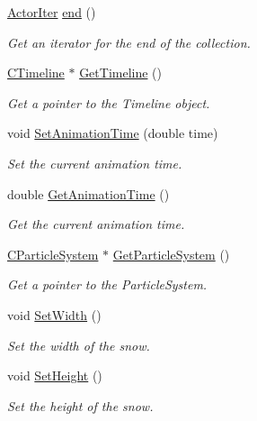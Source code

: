 \begin{DoxyCompactItemize}
\hyperlink{class_c_picture_1_1_actor_iter}{Actor\+Iter} \hyperlink{class_c_picture_a63840c7eff74388a204c750908a23933}{end} ()
\begin{DoxyCompactList}\small\item\em Get an iterator for the end of the collection. \end{DoxyCompactList}\item 
\hyperlink{class_c_timeline}{C\+Timeline} $\ast$ \hyperlink{class_c_picture_a8ba1c7692b6a0ad3cf4984faf84a117a}{Get\+Timeline} ()
\begin{DoxyCompactList}\small\item\em Get a pointer to the Timeline object. \end{DoxyCompactList}\item 
void \hyperlink{class_c_picture_ad00510c4a90a9b84a80a3850cc6dcf3d}{Set\+Animation\+Time} (double time)
\begin{DoxyCompactList}\small\item\em Set the current animation time. \end{DoxyCompactList}\item 
double \hyperlink{class_c_picture_a0b70778e0cc185cb0b58bf18cbc49988}{Get\+Animation\+Time} ()
\begin{DoxyCompactList}\small\item\em Get the current animation time. \end{DoxyCompactList}\item 
\hyperlink{class_c_particle_system}{C\+Particle\+System} $\ast$ \hyperlink{class_c_picture_a816d386d0b99c080ad5ab6efe4879723}{Get\+Particle\+System} ()
\begin{DoxyCompactList}\small\item\em Get a pointer to the Particle\+System. \end{DoxyCompactList}\item 
\hypertarget{class_c_picture_ab16f2951ffac06d345af0fa4e9561d53}{void \hyperlink{class_c_picture_ab16f2951ffac06d345af0fa4e9561d53}{Set\+Width} ()}\label{class_c_picture_ab16f2951ffac06d345af0fa4e9561d53}

\begin{DoxyCompactList}\small\item\em Set the width of the snow. \end{DoxyCompactList}\item 
\hypertarget{class_c_picture_ab586b160fca8c10ab57b18ea704bfb2d}{void \hyperlink{class_c_picture_ab586b160fca8c10ab57b18ea704bfb2d}{Set\+Height} ()}\label{class_c_picture_ab586b160fca8c10ab57b18ea704bfb2d}

\begin{DoxyCompactList}\small\item\em Set the height of the snow. \end{DoxyCompactList}\end{DoxyCompactItemize}


